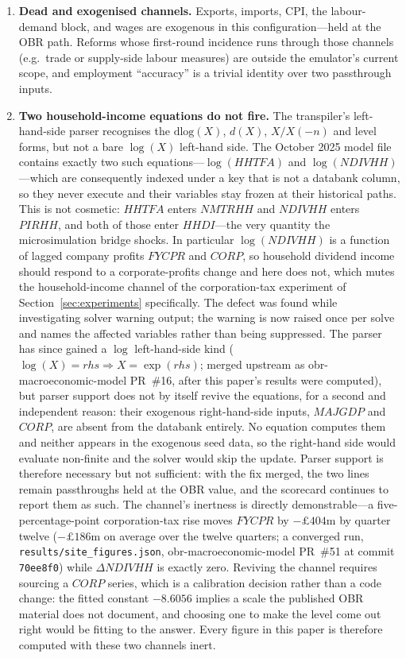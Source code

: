 \begin{enumerate}
\item \textbf{Dead and exogenised channels.} Exports, imports, CPI, the labour-demand block, and wages are exogenous in this configuration---held at the OBR path. Reforms whose first-round incidence runs through those channels (e.g.\ trade or supply-side labour measures) are outside the emulator's current scope, and employment ``accuracy'' is a trivial identity over two passthrough inputs.

\item \textbf{Two household-income equations do not fire.} The transpiler's left-hand-side parser recognises the $\mathrm{dlog}(X)$, $d(X)$, $X/X(-n)$ and level forms, but not a bare $\log(X)$ left-hand side. The October 2025 model file contains exactly two such equations---$\log(HHTFA)$ and $\log(NDIVHH)$---which are consequently indexed under a key that is not a databank column, so they never execute and their variables stay frozen at their historical paths. This is not cosmetic: $HHTFA$ enters $NMTRHH$ and $NDIVHH$ enters $PIRHH$, and both of those enter $HHDI$---the very quantity the microsimulation bridge shocks. In particular $\log(NDIVHH)$ is a function of lagged company profits $FYCPR$ and $CORP$, so household dividend income should respond to a corporate-profits change and here does not, which mutes the household-income channel of the corporation-tax experiment of Section~\ref{sec:experiments} specifically. The defect was found while investigating solver warning output; the warning is now raised once per solve and names the affected variables rather than being suppressed. The parser has since gained a $\log$ left-hand-side kind ($\log(X)=\mathit{rhs} \Rightarrow X=\exp(\mathit{rhs})$; merged upstream as obr-macroeconomic-model PR~\#16, after this paper's results were computed), but parser support does not by itself revive the equations, for a second and independent reason: their exogenous right-hand-side inputs, $MAJGDP$ and $CORP$, are absent from the databank entirely. No equation computes them and neither appears in the exogenous seed data, so the right-hand side would evaluate non-finite and the solver would skip the update. Parser support is therefore necessary but not sufficient: with the fix merged, the two lines remain passthroughs held at the OBR value, and the scorecard continues to report them as such. The channel's inertness is directly demonstrable---a five-percentage-point corporation-tax rise moves $FYCPR$ by $-\pounds404$m by quarter twelve ($-\pounds186$m on average over the twelve quarters; a converged run, \texttt{results/site\_figures.json}, obr-macroeconomic-model PR~\#51 at commit \texttt{70ee8f0}) while $\Delta NDIVHH$ is exactly zero. Reviving the channel requires sourcing a $CORP$ series, which is a calibration decision rather than a code change: the fitted constant $-8.6056$ implies a scale the published OBR material does not document, and choosing one to make the level come out right would be fitting to the answer. Every figure in this paper is therefore computed with these two channels inert.


\end{enumerate}
